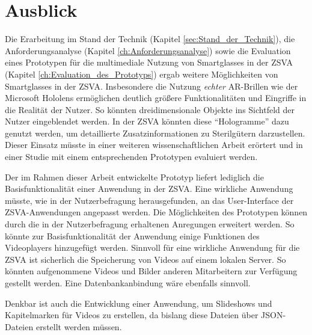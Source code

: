 %
%
%
%
%
%
\chapter{Ausblick}
\label{ch:Ausblick}
%
Die Erarbeitung im Stand der Technik (Kapitel \ref{sec:Stand_der_Technik}), die Anforderungsanalyse (Kapitel \ref{ch:Anforderungsanalyse}) sowie die Evaluation eines Prototypen für die multimediale Nutzung von Smartglasses in der ZSVA (Kapitel \ref{ch:Evaluation_des_Prototyps}) ergab weitere Möglichkeiten von Smartglasses in der ZSVA. Insbesondere die Nutzung \emph{echter} AR-Brillen wie der Microsoft Hololens ermöglichen deutlich größere Funktionalitäten und Eingriffe in die Realität der Nutzer. So könnten dreidimensionale Objekte ins Sichtfeld der Nutzer eingeblendet werden. In der ZSVA könnten diese \enquote{Hologramme} dazu genutzt werden, um detaillierte Zusatzinformationen zu Sterilgütern darzustellen. Dieser Einsatz müsste in einer weiteren wissenschaftlichen Arbeit erörtert und in einer Studie mit einem entsprechenden Prototypen evaluiert werden.

Der im Rahmen dieser Arbeit entwickelte Prototyp liefert lediglich die Basisfunktionalität einer Anwendung in der ZSVA. Eine wirkliche Anwendung müsste, wie in der Nutzerbefragung herausgefunden, an das User-Interface der ZSVA-Anwendungen angepasst werden. Die Möglichkeiten des Prototypen können durch die in der Nutzerbefragung erhaltenen Anregungen erweitert werden. So könnte zur Basisfunktionalität der Anwendung einige Funktionen des Videoplayers hinzugefügt werden. Sinnvoll für eine wirkliche Anwendung für die ZSVA ist sicherlich die Speicherung von Videos auf einem lokalen Server. So könnten aufgenommene Videos und Bilder anderen Mitarbeitern zur Verfügung gestellt werden. Eine Datenbankanbindung wäre ebenfalls sinnvoll. 

Denkbar ist auch die Entwicklung einer Anwendung, um Slideshows und Kapitelmarken für Videos zu erstellen, da bislang diese Dateien über JSON-Dateien erstellt werden müssen.
%
